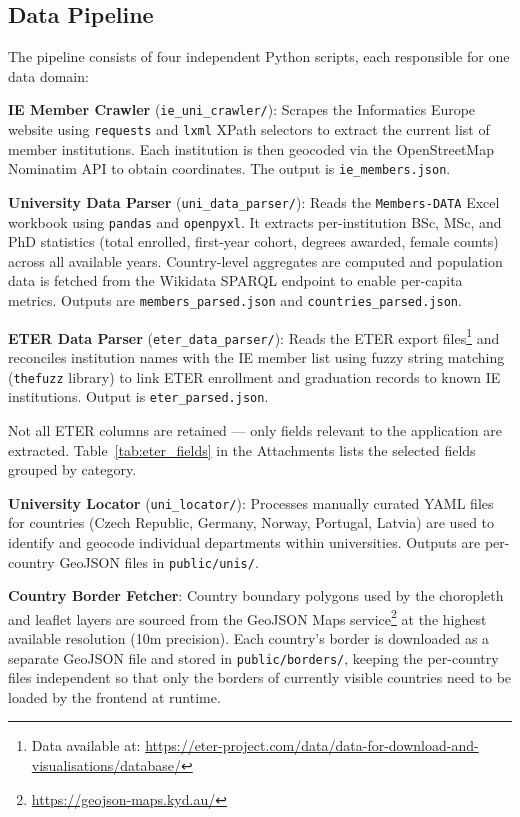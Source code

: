 \documentclass[final,3p,times,twocolumn]{elsarticle}
\begin{document}
\subsection{Data Pipeline}

The pipeline consists of four independent Python scripts, each responsible for one data domain:

\textbf{IE Member Crawler} (\texttt{ie\_uni\_crawler/}): Scrapes the Informatics Europe website using \texttt{requests} and \texttt{lxml} XPath selectors to extract the current list of member institutions. Each institution is then geocoded via the OpenStreetMap Nominatim API to obtain coordinates. The output is \texttt{ie\_members.json}.

\textbf{University Data Parser} (\texttt{uni\_data\_parser/}): Reads the \texttt{Members-DATA} Excel workbook using \texttt{pandas} and \texttt{openpyxl}. It extracts per-institution BSc, MSc, and PhD statistics (total enrolled, first-year cohort, degrees awarded, female counts) across all available years. Country-level aggregates are computed and population data is fetched from the Wikidata SPARQL endpoint to enable per-capita metrics. Outputs are \texttt{members\_parsed.json} and \texttt{countries\_parsed.json}.

\textbf{ETER Data Parser} (\texttt{eter\_data\_parser/}): Reads the ETER export files\footnote{Data available at: \url{https://eter-project.com/data/data-for-download-and-visualisations/database/}} and reconciles institution names with the IE member list using fuzzy string matching (\texttt{thefuzz} library) to link ETER enrollment and graduation records to known IE institutions. Output is \texttt{eter\_parsed.json}.

Not all ETER columns are retained — only fields relevant to the application are extracted. Table~\ref{tab:eter_fields} in the Attachments lists the selected fields grouped by category.

\textbf{University Locator} (\texttt{uni\_locator/}): Processes manually curated YAML files for countries (Czech Republic, Germany, Norway, Portugal, Latvia) are used to identify and geocode individual departments within universities. Outputs are per-country GeoJSON files in \texttt{public/unis/}.

\textbf{Country Border Fetcher}: Country boundary polygons used by the choropleth and leaflet layers are sourced from the GeoJSON Maps service\footnote{\url{https://geojson-maps.kyd.au/}} at the highest available resolution (10m precision). Each country's border is downloaded as a separate GeoJSON file and stored in \texttt{public/borders/}, keeping the per-country files independent so that only the borders of currently visible countries need to be loaded by the frontend at runtime.
\end{document}
